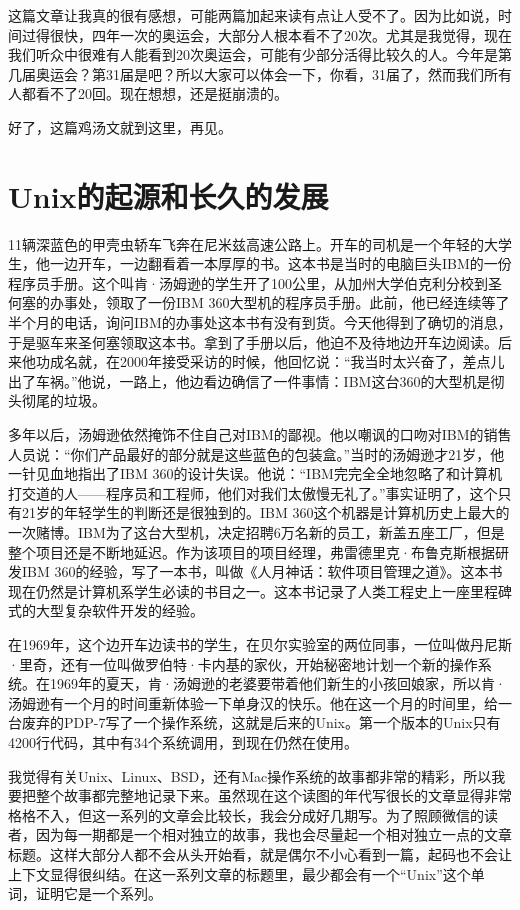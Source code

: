 \documentclass[
  letterpaper,
  DIV=11,
  numbers=noendperiod]{scrreprt}
\begin{document}
这篇文章让我真的很有感想，可能两篇加起来读有点让人受不了。因为比如说，时间过得很快，四年一次的奥运会，大部分人根本看不了20次。尤其是我觉得，现在我们听众中很难有人能看到20次奥运会，可能有少部分活得比较久的人。今年是第几届奥运会？第31届是吧？所以大家可以体会一下，你看，31届了，然而我们所有人都看不了20回。现在想想，还是挺崩溃的。

好了，这篇鸡汤文就到这里，再见。


\chapter{Unix的起源和长久的发展}\label{unixux7684ux8d77ux6e90ux548cux957fux4e45ux7684ux53d1ux5c55}

11辆深蓝色的甲壳虫轿车飞奔在尼米兹高速公路上。开车的司机是一个年轻的大学生，他一边开车，一边翻看着一本厚厚的书。这本书是当时的电脑巨头IBM的一份程序员手册。这个叫肯·汤姆逊的学生开了100公里，从加州大学伯克利分校到圣何塞的办事处，领取了一份IBM
360大型机的程序员手册。此前，他已经连续等了半个月的电话，询问IBM的办事处这本书有没有到货。今天他得到了确切的消息，于是驱车来圣何塞领取这本书。拿到了手册以后，他迫不及待地边开车边阅读。后来他功成名就，在2000年接受采访的时候，他回忆说：``我当时太兴奋了，差点儿出了车祸。''他说，一路上，他边看边确信了一件事情：IBM这台360的大型机是彻头彻尾的垃圾。

多年以后，汤姆逊依然掩饰不住自己对IBM的鄙视。他以嘲讽的口吻对IBM的销售人员说：``你们产品最好的部分就是这些蓝色的包装盒。''当时的汤姆逊才21岁，他一针见血地指出了IBM
360的设计失误。他说：``IBM完完全全地忽略了和计算机打交道的人------程序员和工程师，他们对我们太傲慢无礼了。''事实证明了，这个只有21岁的年轻学生的判断还是很独到的。IBM
360这个机器是计算机历史上最大的一次赌博。IBM为了这台大型机，决定招聘6万名新的员工，新盖五座工厂，但是整个项目还是不断地延迟。作为该项目的项目经理，弗雷德里克·布鲁克斯根据研发IBM
360的经验，写了一本书，叫做《人月神话：软件项目管理之道》。这本书现在仍然是计算机系学生必读的书目之一。这本书记录了人类工程史上一座里程碑式的大型复杂软件开发的经验。

在1969年，这个边开车边读书的学生，在贝尔实验室的两位同事，一位叫做丹尼斯·里奇，还有一位叫做罗伯特·卡内基的家伙，开始秘密地计划一个新的操作系统。在1969年的夏天，肯·汤姆逊的老婆要带着他们新生的小孩回娘家，所以肯·汤姆逊有一个月的时间重新体验一下单身汉的快乐。他在这一个月的时间里，给一台废弃的PDP-7写了一个操作系统，这就是后来的Unix。第一个版本的Unix只有4200行代码，其中有34个系统调用，到现在仍然在使用。

我觉得有关Unix、Linux、BSD，还有Mac操作系统的故事都非常的精彩，所以我要把整个故事都完整地记录下来。虽然现在这个读图的年代写很长的文章显得非常格格不入，但这一系列的文章会比较长，我会分成好几期写。为了照顾微信的读者，因为每一期都是一个相对独立的故事，我也会尽量起一个相对独立一点的文章标题。这样大部分人都不会从头开始看，就是偶尔不小心看到一篇，起码也不会让上下文显得很纠结。在这一系列文章的标题里，最少都会有一个``Unix''这个单词，证明它是一个系列。
\end{document}
